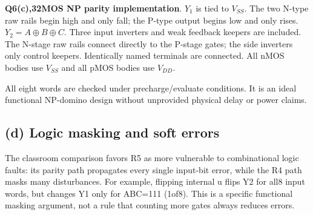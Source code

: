 \documentclass[10pt]{article}
\begin{document}
\begin{center}
\end{center}
\noindent\textbf{Q6(c),32MOS NP parity implementation}. $Y_1$ is tied to $V_{SS}$. The two N-type raw rails begin high and only fall; the P-type output begins low and only rises. $Y_2=A\oplus B\oplus C$. Three input inverters and weak feedback keepers are included. The N-stage raw rails connect directly to the P-stage gates; the side inverters only control keepers.
 Identically named terminals are connected. All nMOS bodies use $V_{SS}$ and all pMOS bodies use $V_{DD}$.

All eight words are checked under precharge/evaluate conditions. It is an ideal functional NP-domino design without unprovided physical delay or power claims.

\subsection*{(d) Logic masking and soft errors}
The classroom comparison favors R5 as more vulnerable to combinational logic faults: its parity path propagates every single input-bit error, while the R4 path masks many disturbances. For example, flipping internal u flips Y2 for all8 input words, but changes Y1 only for ABC=111 (1of8). This is a specific functional masking argument, not a rule that counting more gates always reduces errors.
\end{document}
